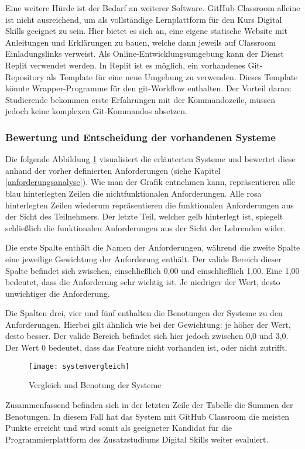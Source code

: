 Eine weitere Hürde ist der Bedarf an weiterer Software. GitHub Classroom alleine
ist nicht ausreichend, um als vollständige Lernplattform für den Kurs Digital
Skills geeignet zu sein. Hier bietet es sich an, eine eigene statische Website
mit Anleitungen und Erklärungen zu bauen, welche dann jeweils auf Classroom
Einladungslinks verweist. Als Online-Entwicklungsumgebung kann der Dienst Replit
verwendet werden. In Replit ist es möglich, ein vorhandenes Git-Repository als
Template für eine neue Umgebung zu verwenden. Dieses Template könnte
Wrapper-Programme für den git-Workflow enthalten. Der Vorteil daran:
Studierende bekommen erste Erfahrungen mit der Kommandozeile, müssen jedoch
keine komplexen Git-Kommandos absetzen.

\subsubsection{Bewertung und Entscheidung der vorhandenen Systeme}
Die folgende Abbildung \ref{fig:systemvergleich} visualisiert die erläuterten
Systeme und bewertet diese anhand der vorher definierten Anforderungen (siehe 
Kapitel \ref{anforderungsanalyse}). Wie man der Grafik entnehmen kann,
repräsentieren alle blau hinterlegten Zeilen die nichtfunktionalen
Anforderungen. Alle rosa hinterlegten Zeilen wiederum repräsentieren die
funktionalen Anforderungen aus der Sicht des Teilnehmers. Der letzte Teil,
welcher gelb hinterlegt ist, spiegelt schließlich die funktionalen Anforderungen
aus der Sicht der Lehrenden wider.

Die erste Spalte enthält die Namen der Anforderungen, während die zweite Spalte
eine jeweilige Gewichtung der Anforderung enthält. Der valide Bereich dieser
Spalte befindet sich zwischen, einschließlich 0,00 und einschließlich 1,00. Eine
1,00 bedeutet, dass die Anforderung sehr wichtig ist. Je niedriger der Wert,
desto unwichtiger die Anforderung.

Die Spalten drei, vier und fünf enthalten die Benotungen der Systeme zu den
Anforderungen. Hierbei gilt ähnlich wie bei der Gewichtung: je höher der Wert,
desto besser. Der valide Bereich befindet sich hier jedoch zwischen 0,0 und 3,0.
Der Wert 0 bedeutet, dass das Feature nicht vorhanden ist, oder nicht zutrifft.

\begin{figure}[H]
    \centering
    \texttt{[image: systemvergleich]}
    \caption{Vergleich und Benotung der Systeme}
    \label{fig:systemvergleich}
\end{figure}

Zusammenfassend befinden sich in der letzten Zeile der Tabelle die Summen der Benotungen. In diesem Fall hat das System mit GitHub Classroom die meisten
Punkte erreicht und wird somit als geeigneter Kandidat für die
Programmierplattform des Zusatzstudiums Digital Skills weiter evaluiert.